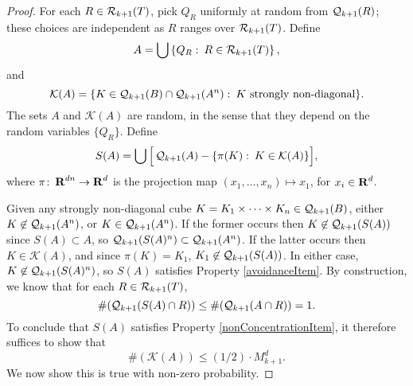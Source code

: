 \begin{proof}
	For each $R \in \operatorname{\mathcal{R}}_{k+1}(T)$, pick $Q_R$ uniformly at random from $\operatorname{\mathcal{Q}}_{k+1}(R)$; these choices are independent as $R$ ranges over $\operatorname{\mathcal{R}}_{k+1}(T)$. Define
	\[ A = \bigcup \left\{ Q_R \operatorname{\colon} R \in \operatorname{\mathcal{R}}_{k+1}(T) \right\}, \]
	and
	\[ \mathcal{K}(A) = \{ K \in \operatorname{\mathcal{Q}}_{k+1}(B) \cap \operatorname{\mathcal{Q}}_{k+1}(A^n) \operatorname{\colon} \text{$K$ strongly non-diagonal} \}. \]
	The sets $A$ and $\mathcal{K}(A)$ are random, in the sense that they depend on the random variables $\{ Q_R \}$. Define
	\begin{equation} \label{defnOfF}
		S(A) = \bigcup \Big[ \operatorname{\mathcal{Q}}_{k+1}(A) - \{ \pi(K) \operatorname{\colon} K \in \mathcal{K}(A) \} \Big],
	\end{equation}
	where $\pi \colon \operatorname{\mathbf{R}}^{dn} \to \operatorname{\mathbf{R}}^d$ is the projection map $(x_1, \dots, x_n) \mapsto x_1$, for $x_i \in \operatorname{\mathbf{R}}^d$.

	Given any strongly non-diagonal cube $K = K_1 \times \cdots \times K_n \in \operatorname{\mathcal{Q}}_{k+1}(B)$, either $K \not \in \operatorname{\mathcal{Q}}_{k+1}(A^n)$, or $K \in \operatorname{\mathcal{Q}}_{k+1}(A^n)$. If the former occurs then $K \not \in \operatorname{\mathcal{Q}}_{k+1}(S(A))$ since $S(A) \subset A$, so $\operatorname{\mathcal{Q}}_{k+1}(S(A)^n) \subset \operatorname{\mathcal{Q}}_{k+1}(A^n)$. If the latter occurs then $K \in \mathcal{K}(A)$, and since $\pi(K) = K_1$, $K_1 \not \in \operatorname{\mathcal{Q}}_{k+1}(S(A))$. In either case, $K \not \in \operatorname{\mathcal{Q}}_{k+1}(S(A)^n)$, so $S(A)$ satisfies Property \ref{avoidanceItem}. By construction, we know that for each $R \in \operatorname{\mathcal{R}}_{k+1}(T)$,
	\begin{equation} \label{equation8423246093490} \#(\operatorname{\mathcal{Q}}_{k+1}(S(A) \cap R)) \leq \#(\operatorname{\mathcal{Q}}_{k+1}(A \cap R)) = 1. \end{equation}
	To conclude that $S(A)$ satisfies Property \ref{nonConcentrationItem}, it therefore suffices to show that
	\[ \# (\mathcal{K}(A)) \leq (1/2) \cdot M_{k+1}^d. \]
	We now show this is true with non-zero probability.


\end{proof}
